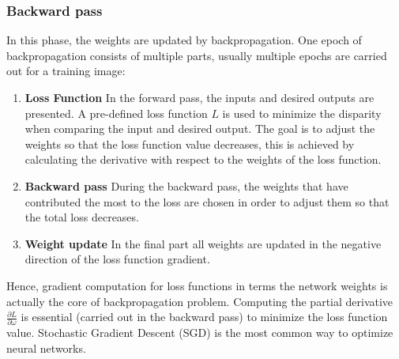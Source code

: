     \subsubsection{Backward pass}
    In this phase, the weights are updated by backpropagation. One epoch of backpropagation consists of multiple parts, usually multiple epochs are carried out for a training image:
    \begin{enumerate}
        \item \textbf{Loss Function} In the forward pass, the inputs and desired outputs are presented. A pre-defined loss function $L$ is used to minimize the disparity when comparing the input and desired output. The goal is to adjust the weights so that the loss function value decreases, this is achieved by calculating the derivative with respect to the weights of the loss function.
        \item \textbf{Backward pass} During the backward pass, the weights that have contributed the most to the loss are chosen in order to adjust them so that the total loss decreases.
        \item \textbf{Weight update} In the final part all weights are updated in the negative direction of the loss function gradient.
    \end{enumerate}
    
    Hence, gradient computation for loss functions in terms the network weights is actually the core of backpropagation problem. Computing the partial derivative $\frac{\partial L}{\partial \omega}$ is essential (carried out in the backward pass) to minimize the loss function value. Stochastic Gradient Descent (SGD) is the most common way to optimize neural networks.

